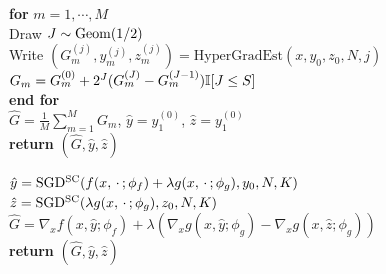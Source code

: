 {\begin{algorithm*}[t]
\caption{MLMC-HyperGradEst$(x, y_0, z_0, \phi_f, \phi_g, M,  N,  S)$} \label{alg:F2HE}
\begin{algorithmic}[1] 
\STATE \textbf{for} $m=1,\cdots,M$ \\ [1mm]
\STATE \quad Draw $J \sim {\rm Geom}(1/2)$ \\[1mm]  
\STATE \quad Write $(G_m^{(j)}, y_m^{(j)} , z_m^{(j)}) = \text{HyperGradEst}(x,y_0,z_0, N, j )$ \\[1mm]
\STATE \quad $G_m = G_m^{(0)} + 2^J (G_m^{(J)} - G_m^{(J-1)}) {\mathbb{I}}[ J \le S] $ \\[1mm] %
\STATE \textbf{end for} \\[1mm]
\STATE $ \hat G = \frac{1}{M} \sum_{m=1}^M G_m$, $ \hat y = y_1^{(0)}$, $ \hat z = y_1^{(0)}$ \\[1mm]
\STATE \textbf{return} $(\hat G, \hat y , \hat z)$ 
\end{algorithmic}
\end{algorithm*}

\begin{algorithm*}[t]  
\caption{HyperGradEst$(x, y_0, z_0, \phi_f, \phi_g,  N, K)$} \label{alg:single-F2HE}
\begin{algorithmic}[1] 
\STATE $\hat y = \text{SGD}{}^{\rm SC}( f(x,\,\cdot\,; \phi_f) + \lambda g(x, \,\cdot\,; \phi_g), y_0, N, K) $ \\[1mm]
\STATE $\hat z = \text{SGD}{}^{\rm SC}( \lambda g(x,\,\cdot\,; \phi_g) , z_0, N, K) $ \\[1mm]
\STATE $\hat G = \nabla_x f(x,\hat y; \phi_f) + \lambda (\nabla_x g(x, \hat y; \phi_g) - \nabla_x g(x, \hat z; \phi_g)) $ \\[1mm]
\STATE \textbf{return} $(\hat G, \hat y, \hat z)$
\end{algorithmic}
\end{algorithm*}

}
